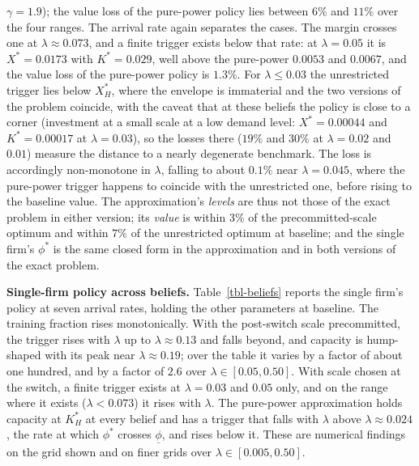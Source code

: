 \documentclass[
  11pt,
  letterpaper,
]{scrartcl}
\begin{document}
\(\gamma = 1.9\)); the value loss of the pure-power policy lies between
\(6\%\) and \(11\%\) over the four ranges. The arrival rate again
separates the cases. The margin crosses one at
\(\lambda \approx 0.073\), and a finite trigger exists below that rate:
at \(\lambda = 0.05\) it is \(X^* = 0.0173\) with \(K^* = 0.029\), well
above the pure-power \(0.0053\) and \(0.0067\), and the value loss of
the pure-power policy is \(1.3\%\). For \(\lambda \leq 0.03\) the
unrestricted trigger lies below \(X_H^*\), where the envelope is
immaterial and the two versions of the problem coincide, with the caveat
that at these beliefs the policy is close to a corner (investment at a
small scale at a low demand level: \(X^* = 0.00044\) and
\(K^* = 0.00017\) at \(\lambda = 0.03\)), so the losses there (\(19\%\)
and \(30\%\) at \(\lambda = 0.02\) and \(0.01\)) measure the distance to
a nearly degenerate benchmark. The loss is accordingly non-monotone in
\(\lambda\), falling to about \(0.1\%\) near \(\lambda = 0.045\), where
the pure-power trigger happens to coincide with the unrestricted one,
before rising to the baseline value. The approximation's \emph{levels}
are thus not those of the exact problem in either version; its
\emph{value} is within \(3\%\) of the precommitted-scale optimum and
within \(7\%\) of the unrestricted optimum at baseline; and the single
firm's \(\phi^*\) is the same closed form in the approximation and in
both versions of the exact problem.

\textbf{Single-firm policy across beliefs.} Table~\ref{tbl-beliefs}
reports the single firm's policy at seven arrival rates, holding the
other parameters at baseline. The training fraction rises monotonically.
With the post-switch scale precommitted, the trigger rises with
\(\lambda\) up to \(\lambda \approx 0.13\) and falls beyond, and
capacity is hump-shaped with its peak near \(\lambda \approx 0.19\);
over the table it varies by a factor of about one hundred, and by a
factor of \(2.6\) over \(\lambda \in [0.05, 0.50]\). With scale chosen
at the switch, a finite trigger exists at \(\lambda = 0.03\) and
\(0.05\) only, and on the range where it exists (\(\lambda < 0.073\)) it
rises with \(\lambda\). The pure-power approximation holds capacity at
\(K_H^*\) at every belief and has a trigger that falls with \(\lambda\)
above \(\lambda \approx 0.024\), the rate at which \(\phi^*\) crosses
\(\underline{\phi}\), and rises below it. These are numerical findings
on the grid shown and on finer grids over \(\lambda \in [0.005, 0.50]\).
\end{document}
